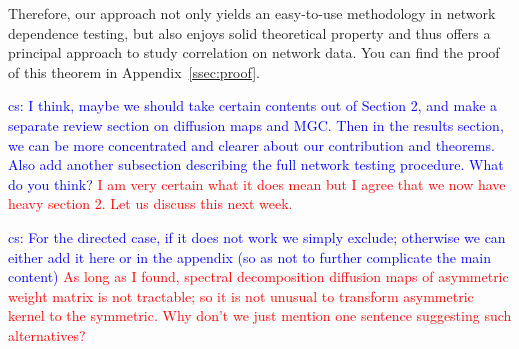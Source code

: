 \documentclass[11pt]{article}
\theoremstyle{definition}
\newcommand{\cs}[1]{\textcolor{blue}{cs: #1}}
\begin{document}
	Therefore, our approach not only yields an easy-to-use methodology in network dependence testing, but also enjoys solid theoretical property and thus offers a principal approach to study correlation on network data. You can find the proof of this theorem in Appendix~\ref{ssec:proof}.
	
	\cs{I think, maybe we should take certain contents out of Section 2, and make a separate review section on diffusion maps and MGC. Then in the results section, we can be more concentrated and clearer about our contribution and theorems. Also add another subsection describing the full network testing procedure. What do you think?}
	\textcolor{red}{I am very certain what it does mean but I agree that we now have heavy section 2. Let us discuss this next week.}
	
	\cs{For the directed case, if it does not work we simply exclude; otherwise we can either add it here or in the appendix (so as not to further complicate the main content)}
	\textcolor{red}{As long as I found, spectral decomposition diffusion maps of asymmetric weight matrix is not tractable; so it is not unusual to transform asymmetric kernel to the symmetric. Why don't we just mention one sentence suggesting such alternatives?  }
	
	
\end{document}
